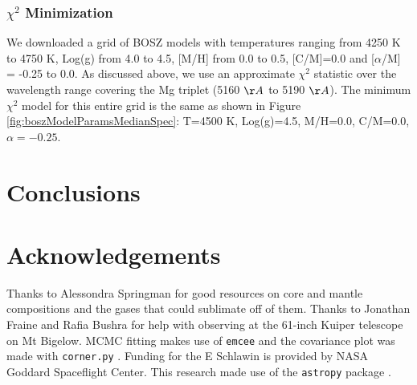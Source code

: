 \documentclass[twocolumn]{aastex61}
\begin{document}
\subsubsection{$\chi^2$ Minimization}
We downloaded a grid of BOSZ models with temperatures ranging from 4250 K to 4750 K, Log(g) from 4.0 to 4.5, [M/H] from 0.0 to 0.5, [C/M]=0.0 and [$\alpha$/M] = -0.25 to 0.0.
As discussed above, we use an approximate $\chi^2$ statistic over the wavelength range covering the Mg triplet (5160 $\AA$ to 5190 $\AA$).
The minimum $\chi^2$ model for this entire grid is the same as shown in Figure \ref{fig:boszModelParamsMedianSpec}: T=4500 K, Log(g)=4.5, M/H=0.0, C/M=0.0, $\alpha=-0.25$.

\clearpage

\section{Conclusions}\label{sec:conclusions}

\section{Acknowledgements}
Thanks to Alessondra Springman for good resources on core and mantle compositions and the gases that could sublimate off of them.
Thanks to Jonathan Fraine and Rafia Bushra for help with observing at the 61-inch Kuiper telescope on Mt Bigelow.
MCMC fitting makes use of \texttt{emcee} \citep{foreman-mackey2013emcee} and the covariance plot was made with \texttt{corner.py} \citep{foremanCorner}.
Funding for the E Schlawin is provided by NASA Goddard Spaceflight Center.
This research made use of the \texttt{astropy} package \citep{astropy2013}.


\end{document}
